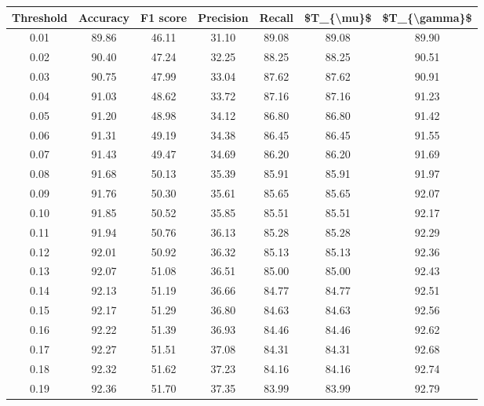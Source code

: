 \begin{tabular}{|c|c|c|c|c|c|c|}
\hline
 Threshold &  Accuracy &  F1 score &  Precision &  Recall &  \$T\_\{\textbackslash mu\}\$ &  \$T\_\{\textbackslash gamma\}\$ \\
\hline
      0.01 &     89.86 &     46.11 &      31.10 &   89.08 &      89.08 &         89.90 \\
      0.02 &     90.40 &     47.24 &      32.25 &   88.25 &      88.25 &         90.51 \\
      0.03 &     90.75 &     47.99 &      33.04 &   87.62 &      87.62 &         90.91 \\
      0.04 &     91.03 &     48.62 &      33.72 &   87.16 &      87.16 &         91.23 \\
      0.05 &     91.20 &     48.98 &      34.12 &   86.80 &      86.80 &         91.42 \\
      0.06 &     91.31 &     49.19 &      34.38 &   86.45 &      86.45 &         91.55 \\
      0.07 &     91.43 &     49.47 &      34.69 &   86.20 &      86.20 &         91.69 \\
      0.08 &     91.68 &     50.13 &      35.39 &   85.91 &      85.91 &         91.97 \\
      0.09 &     91.76 &     50.30 &      35.61 &   85.65 &      85.65 &         92.07 \\
      0.10 &     91.85 &     50.52 &      35.85 &   85.51 &      85.51 &         92.17 \\
      0.11 &     91.94 &     50.76 &      36.13 &   85.28 &      85.28 &         92.29 \\
      0.12 &     92.01 &     50.92 &      36.32 &   85.13 &      85.13 &         92.36 \\
      0.13 &     92.07 &     51.08 &      36.51 &   85.00 &      85.00 &         92.43 \\
      0.14 &     92.13 &     51.19 &      36.66 &   84.77 &      84.77 &         92.51 \\
      0.15 &     92.17 &     51.29 &      36.80 &   84.63 &      84.63 &         92.56 \\
      0.16 &     92.22 &     51.39 &      36.93 &   84.46 &      84.46 &         92.62 \\
      0.17 &     92.27 &     51.51 &      37.08 &   84.31 &      84.31 &         92.68 \\
      0.18 &     92.32 &     51.62 &      37.23 &   84.16 &      84.16 &         92.74 \\
      0.19 &     92.36 &     51.70 &      37.35 &   83.99 &      83.99 &         92.79 \\

\end{tabular}

